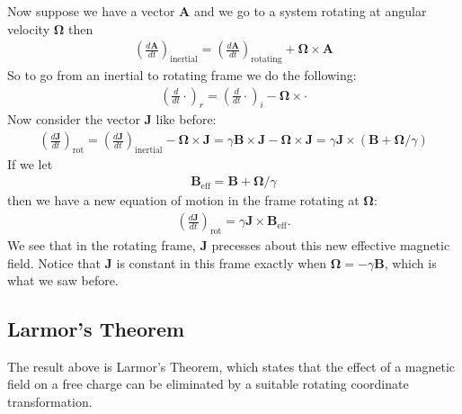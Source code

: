 \documentclass{book}
\theoremstyle{definition}
\newcommand{\f}[2]{\frac{#1}{#2}}
\newcommand{\lp}{\left(}
\newcommand{\rp}{\right)}
\begin{document}
Now suppose we have a vector  $\bm{A}$ and we go to a system rotating at angular velocity $\bm{\Omega}$ then 
\begin{align*}
	{\lp \f{d\bm{A}}{dt} \rp_\text{inertial} = \lp \f{d\bm{A}}{dt} \rp_\text{rotating} + \bm{\Omega}\times \bm{A}}
\end{align*}
So to go from an inertial to rotating frame we do the following:
\begin{align*}
	\boxed{\lp \f{d}{dt}\cdot \rp_r = \lp \f{d}{dt}\cdot \rp_i - \bm{\Omega}\times \cdot}
\end{align*}
Now consider the vector $\bm{J}$ like before:
\begin{align*}
	\lp \f{d\bm{J}}{dt} \rp_\text{rot}  =  \lp \f{d\bm{J}}{dt} \rp_\text{inertial} - \bm{\Omega}\times \bm{J} = \gamma \bm{B}\times \bm{J} - \bm{\Omega}\times \bm{J} = \gamma \bm{J}\times (\bm{B} + \bm{\Omega}/\gamma)
\end{align*}
If we let 
\begin{align*}
	\bm{B}_\text{eff} = \bm{B} + \bm{\Omega}/\gamma
\end{align*}
then we have a new equation of motion in the frame rotating at $\bm{\Omega}$:
\begin{align*}
	\lp \f{d\bm{J}}{dt} \rp_\text{rot} = \gamma \bm{J} \times \bm{B}_\text{eff}.
\end{align*}
We see that in the rotating frame, $\bm{J}$ precesses about this new effective magnetic field. Notice that $\bm{J}$ is constant in this frame exactly when $\bm{\Omega} = -\gamma \bm{B}$, which is what we saw before.




\subsection{Larmor's Theorem}

The result above is Larmor's Theorem, which states that the effect of a magnetic field on a free charge can be eliminated by a suitable rotating coordinate transformation. \\
\end{document}
